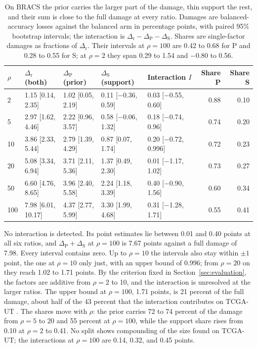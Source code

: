 \begin{table}[htbp]
\centering
\small
\setlength{\tabcolsep}{4pt}
\renewcommand{\arraystretch}{1.15}
\begin{tabular}{@{}lllllrr@{}}
\toprule
$\rho$ & $\Delta_\text{r}$ (both) & $\Delta_\text{P}$ (prior) & $\Delta_\text{S}$ (support) & Interaction $I$ & Share P & Share S \\
\midrule
2 & 1.15 [0.14, 2.35] & 1.02 [0.05, 2.19] & 0.11 [$-$0.36, 0.59] & 0.03 [$-$0.55, 0.60] & 0.88 & 0.10 \\
5 & 2.97 [1.62, 4.46] & 2.22 [0.96, 3.57] & 0.58 [$-$0.06, 1.32] & 0.18 [$-$0.74, 0.96] & 0.74 & 0.20 \\
10 & 3.86 [2.33, 5.44] & 2.79 [1.39, 4.29] & 0.87 [0.07, 1.74] & 0.20 [$-$0.72, 0.996] & 0.72 & 0.23 \\
20 & 5.08 [3.34, 6.94] & 3.71 [2.11, 5.36] & 1.37 [0.49, 2.30] & 0.01 [$-$1.17, 1.02] & 0.73 & 0.27 \\
50 & 6.60 [4.76, 8.65] & 3.96 [2.40, 5.58] & 2.24 [1.18, 3.39] & 0.40 [$-$0.90, 1.56] & 0.60 & 0.34 \\
100 & 7.98 [6.01, 10.17] & 4.37 [2.77, 5.99] & 3.30 [1.99, 4.68] & 0.31 [$-$1.28, 1.71] & 0.55 & 0.41 \\
\bottomrule
\end{tabular}
\caption{On BRACS the prior carries the larger part of the damage, thin support the rest, and their sum is close to the full damage at every ratio. Damages are balanced-accuracy losses against the balanced arm in percentage points, with paired 95\% bootstrap intervals; the interaction is $\Delta_\text{r}-\Delta_\text{P}-\Delta_\text{S}$. Shares are single-factor damages as fractions of $\Delta_\text{r}$. Their intervals at $\rho=100$ are 0.42 to 0.68 for P and 0.28 to 0.55 for S; at $\rho=2$ they span 0.29 to 1.54 and $-0.80$ to 0.56.}
\label{tab:decomposition}
\end{table}

\noindent No interaction is detected. Its point estimates lie between 0.01 and 0.40 points at all six ratios, and $\Delta_\text{P}+\Delta_\text{S}$ at $\rho=100$ is 7.67 points against a full damage of 7.98. Every interval contains zero. Up to $\rho=10$ the intervals also stay within $\pm1$ point, the one at $\rho=10$ only just, with an upper bound of 0.996; from $\rho=20$ on they reach 1.02 to 1.71 points. By the criterion fixed in Section~\ref{sec:evaluation}, the factors are additive from $\rho=2$ to 10, and the interaction is unresolved at the larger ratios. The upper bound at $\rho=100$, 1.71 points, is 21 percent of the full damage, about half of the 43 percent that the interaction contributes on TCGA-UT \citep{queisler2026causeTcga}. The shares move with $\rho$: the prior carries 72 to 74 percent of the damage from $\rho=5$ to 20 and 55 percent at $\rho=100$, while the support share rises from 0.10 at $\rho=2$ to 0.41. No split shows compounding of the size found on TCGA-UT; the interactions at $\rho=100$ are 0.14, 0.32, and 0.45 points.


